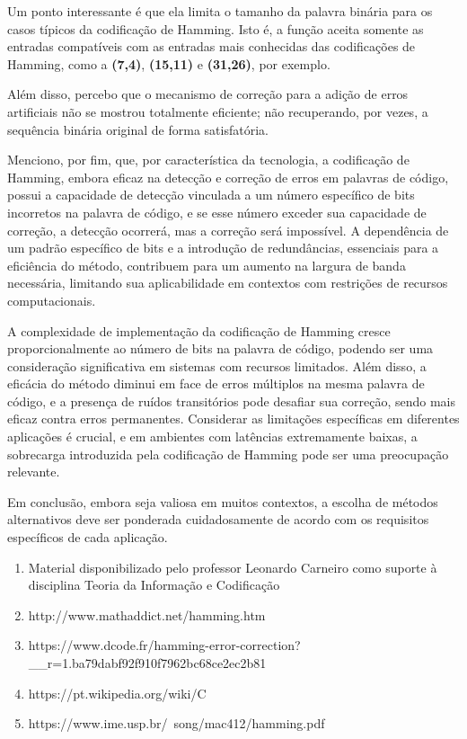 \documentclass{article}
\begin{document}
Um ponto interessante é que ela limita o tamanho da palavra binária para os casos típicos da codificação de Hamming. Isto é, a função aceita somente as entradas compatíveis com as entradas mais conhecidas das codificações de Hamming, como a \textbf{(7,4)}, \textbf{(15,11)} e \textbf{(31,26)}, por exemplo.

Além disso, percebo que o mecanismo de correção para a adição de erros artificiais não se mostrou totalmente eficiente; não recuperando, por vezes, a sequência binária original de forma satisfatória.

Menciono, por fim, que, por característica da tecnologia, a codificação de Hamming, embora eficaz na detecção e correção de erros em palavras de código, possui a capacidade de detecção vinculada a um número específico de bits incorretos na palavra de código, e se esse número exceder sua capacidade de correção, a detecção ocorrerá, mas a correção será impossível. A dependência de um padrão específico de bits e a introdução de redundâncias, essenciais para a eficiência do método, contribuem para um aumento na largura de banda necessária, limitando sua aplicabilidade em contextos com restrições de recursos computacionais.

A complexidade de implementação da codificação de Hamming cresce proporcionalmente ao número de bits na palavra de código, podendo ser uma consideração significativa em sistemas com recursos limitados. Além disso, a eficácia do método diminui em face de erros múltiplos na mesma palavra de código, e a presença de ruídos transitórios pode desafiar sua correção, sendo mais eficaz contra erros permanentes. Considerar as limitações específicas em diferentes aplicações é crucial, e em ambientes com latências extremamente baixas, a sobrecarga introduzida pela codificação de Hamming pode ser uma preocupação relevante. 

Em conclusão, embora seja valiosa em muitos contextos, a escolha de métodos alternativos deve ser ponderada cuidadosamente de acordo com os requisitos específicos de cada aplicação.




\begin{enumerate}
    \item 
    Material disponibilizado pelo professor Leonardo Carneiro como suporte à disciplina Teoria da Informação e Codificação 
    \item 
    http://www.mathaddict.net/hamming.htm
    \item https://www.dcode.fr/hamming-error-correction?\_\_r=1.ba79dabf92f910f7962bc68ce2ec2b81
    \item https://pt.wikipedia.org/wiki/C%
    \item https://www.ime.usp.br/~song/mac412/hamming.pdf
\end{enumerate}
\end{document}

